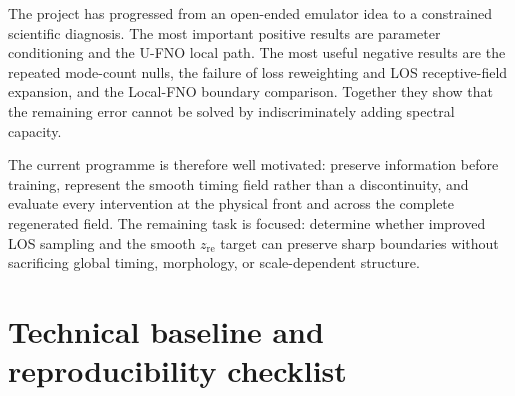 \documentclass[11pt,a4paper]{article}
\newcommand{\zre}{z_{\mathrm{re}}}
\begin{document}
The project has progressed from an open-ended emulator idea to a constrained
scientific diagnosis. The most important positive results are parameter
conditioning and the U-FNO local path. The most useful negative results are
the repeated mode-count nulls, the failure of loss reweighting and LOS
receptive-field expansion, and the Local-FNO boundary comparison. Together
they show that the remaining error cannot be solved by indiscriminately adding
spectral capacity.

The current programme is therefore well motivated: preserve information before
training, represent the smooth timing field rather than a discontinuity, and
evaluate every intervention at the physical front and across the complete
regenerated field. The remaining task is focused: determine whether improved
LOS sampling and the smooth \(\zre\) target can preserve sharp boundaries
without sacrificing global timing, morphology, or scale-dependent structure.

\appendix

\section{Technical baseline and reproducibility checklist}
\end{document}
